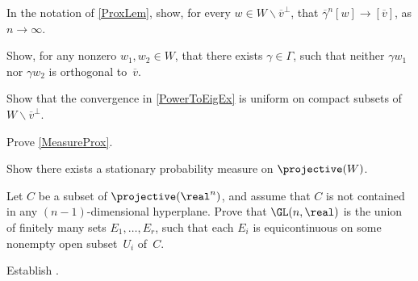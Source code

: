 \begin{exercises}

\item \label{PowerToEigEx}
In the notation of \cref{ProxLem}, show, for every $w \in W \smallsetminus \overline{v}^\perp$, that $\overline\gamma^n[w] \to [\overline{v}]$, as $n \to \infty$.

\item \label{MoveBothOutOfOrthCompEx}
Show, for any nonzero $w_1,w_2 \in W$, that there exists $\gamma \in \Gamma$, such that neither $\gamma w_1$ nor $\gamma w_2$ is orthogonal to~$\overline{v}$.

\item \label{PowerToEigUnifEx}
Show that the convergence in \cref{PowerToEigEx} is uniform on compact subsets of $W \smallsetminus \overline{v}^\perp$.

\item \label{MeasureProxEx}
Prove \cref{MeasureProx}.

\item \label{ExistStatMeasEx}
Show there exists a stationary probability measure on $\projective(W)$.

\item \label{EquiOnProj}
Let $C$ be a subset of $\projective(\real^n)$, and assume that $C$ is not contained in any $(n-1)$-dimensional hyperplane.
Prove that $\GL(n,\real)$ is the union of finitely many sets $E_1,\ldots,E_r$, such that each $E_i$ is equicontinuous on some nonempty open subset~$U_i$ of~$C$.

\item \label{DeleteGammaEx}
Establish .


\end{exercises}
